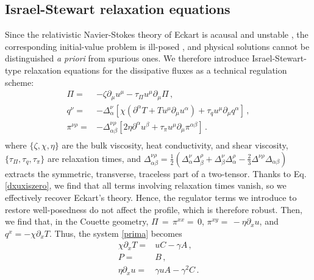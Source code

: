 \documentclass[a4paper, amsfonts, amssymb, amsmath, reprint, showkeys, nofootinbib, twoside,notitlepage,onecolumn]{revtex4-1}
\theoremstyle{definition}
\theoremstyle{theorem}
\begin{document}
\vspace{-0.3cm}
\subsection{Israel-Stewart relaxation equations}
\vspace{-0.3cm}

Since the relativistic Navier-Stokes theory of Eckart \cite{Eckart40} is acausal and unstable \cite{Hiscock_Insatibility_first_order}, the corresponding initial-value problem is ill-posed \cite{Kost2000,GavassinoSuperlum2021}, and physical solutions cannot be distinguished \emph{a priori} from spurious ones. We therefore introduce Israel-Stewart-type relaxation equations for the dissipative fluxes \cite{Israel_Stewart_1979} as a technical regulation scheme:
\begin{equation}\label{Israeliamo!}
\begin{split}
\Pi={}& -\zeta \partial_\mu u^\mu-\tau_\Pi u^\mu \partial_\mu \Pi \, , \\
q^\nu={}& -\Delta^{\nu}_\alpha[\chi( \partial^\alpha T +T u^\mu \partial_\mu u^\alpha)+\tau_q u^\mu \partial_\mu q^\alpha] \, , \\
\pi^{\nu\rho}={}& -\Delta^{\nu \rho}_{\alpha \beta}[2\eta \partial^\alpha u^\beta +\tau_\pi u^\mu \partial_\mu \pi^{\alpha\beta}] \, . \\
\end{split}
\end{equation}
where $\{\zeta,\chi,\eta\}$ are the bulk viscosity, heat conductivity, and shear viscosity, $\{\tau_\Pi,\tau_q,\tau_\pi\}$ are relaxation times, and $\Delta^{\nu \rho}_{\alpha \beta}=\frac{1}{2}(\Delta^\nu_\alpha \Delta^\rho_\beta +\Delta^\nu_\beta \Delta^\rho_\alpha-\frac{2}{3}\Delta^{\nu \rho}\Delta_{\alpha\beta})$ extracts the symmetric, transverse, traceless part of a two-tensor. Thanks to Eq. \eqref{dxuxiszero}, we find that all terms involving relaxation times vanish, so we effectively recover Eckart's theory. Hence, the regulator terms we introduce to restore well-posedness do not affect the profile, which is therefore robust. Then, we find that, in the Couette geometry, $\Pi\,{=}\,\pi^{xx}{=}\,0$, $\pi^{xy}{=}\,{-}\eta\partial_x u$, and $q^x{=}{-}\chi \partial_x T$. Thus, the system \eqref{prima} becomes
\begin{equation}\label{dopo}
\begin{split}
\chi \partial_x T={}& uC-\gamma A \, ,\\
P={}& B \, , \\
\eta \partial_x u={}& \gamma u A-\gamma^2 C \, .\\
\end{split}
\end{equation}
\end{document}
